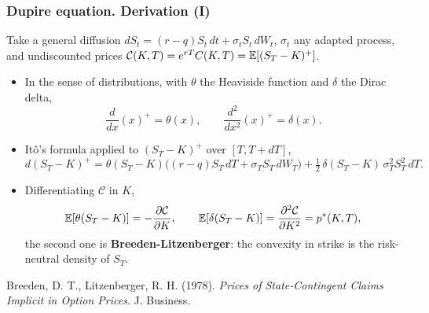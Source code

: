 \begin{frame}
\frametitle{Dupire equation. Derivation (I)}
\begin{scriptsize}
Take a general diffusion $dS_t = (r - q) S_t\, dt + \sigma_t S_t\, dW_t$, $\sigma_t$ any adapted process,
and undiscounted prices $\mathcal{C}(K,T) = e^{rT} C(K,T) = \mathbb{E}[(S_T - K)^+]$.
\begin{itemize}
\item In the sense of distributions, with $\theta$ the Heaviside function and $\delta$ the Dirac delta,
\begin{equation*}
    \frac{d}{dx}(x)^+ = \theta(x),
    \qquad
    \frac{d^2}{dx^2}(x)^+ = \delta(x).
\end{equation*}
\item It\^{o}'s formula applied to $(S_T - K)^+$ over $[T, T + dT]$,
\begin{equation*}
    d(S_T - K)^+
    = \theta(S_T - K)\bigl((r-q) S_T\, dT + \sigma_T S_T\, dW_T\bigr)
    + \tfrac{1}{2}\,\delta(S_T - K)\,\sigma_T^2 S_T^2\, dT.
\end{equation*}
\item Differentiating $\mathcal{C}$ in $K$,
\begin{equation*}
    \mathbb{E}\!\left[\theta(S_T - K)\right] = -\frac{\partial \mathcal{C}}{\partial K},
    \qquad
    \mathbb{E}\!\left[\delta(S_T - K)\right] = \frac{\partial^2 \mathcal{C}}{\partial K^2} = p^*(K, T),
\end{equation*}
the second one is \textbf{Breeden-Litzenberger}: the convexity in strike is the risk-neutral density of $S_T$.
\end{itemize}
\medskip
Breeden, D. T., Litzenberger, R. H. (1978). \emph{Prices of State-Contingent Claims Implicit in Option Prices}. J. Business.
\end{scriptsize}
\end{frame}

